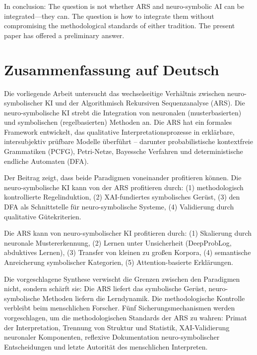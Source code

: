 \documentclass[12pt,a4paper]{article}
\begin{document}
In conclusion: The question is not whether ARS and neuro-symbolic AI can be 
integrated—they can. The question is how to integrate them without compromising 
the methodological standards of either tradition. The present paper has offered 
a preliminary answer.

\newpage
{}

\section*{Zusammenfassung auf Deutsch}

Die vorliegende Arbeit untersucht das wechselseitige Verhältnis zwischen 
neuro-symbolischer KI und der Algorithmisch Rekursiven Sequenzanalyse (ARS). 
Die neuro-symbolische KI strebt die Integration von neuronalen (musterbasierten) 
und symbolischen (regelbasierten) Methoden an. Die ARS hat ein formales Framework 
entwickelt, das qualitative Interpretationsprozesse in erklärbare, intersubjektiv 
prüfbare Modelle überführt – darunter probabilistische kontextfreie Grammatiken 
(PCFG), Petri-Netze, Bayessche Verfahren und deterministische endliche Automaten 
(DFA).

Der Beitrag zeigt, dass beide Paradigmen voneinander profitieren können. Die 
neuro-symbolische KI kann von der ARS profitieren durch:
(1) methodologisch kontrollierte Regelinduktion,
(2) XAI-fundiertes symbolisches Gerüst,
(3) den DFA als Schnittstelle für neuro-symbolische Systeme,
(4) Validierung durch qualitative Gütekriterien.

Die ARS kann von neuro-symbolischer KI profitieren durch:
(1) Skalierung durch neuronale Mustererkennung,
(2) Lernen unter Unsicherheit (DeepProbLog, abduktives Lernen),
(3) Transfer von kleinen zu großen Korpora,
(4) semantische Anreicherung symbolischer Kategorien,
(5) Attention-basierte Erklärungen.

Die vorgeschlagene Synthese verwischt die Grenzen zwischen den Paradigmen nicht, 
sondern schärft sie: Die ARS liefert das symbolische Gerüst, neuro-symbolische 
Methoden liefern die Lerndynamik. Die methodologische Kontrolle verbleibt beim 
menschlichen Forscher. Fünf Sicherungsmechanismen werden vorgeschlagen, um die 
methodologischen Standards der ARS zu wahren: Primat der Interpretation, 
Trennung von Struktur und Statistik, XAI-Validierung neuronaler Komponenten, 
reflexive Dokumentation neuro-symbolischer Entscheidungen und letzte Autorität 
des menschlichen Interpreten.
\end{document}
